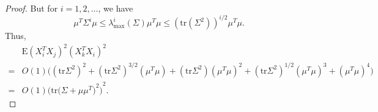 \documentclass[review]{elsarticle}
\theoremstyle{plain}
\theoremstyle{definition}
\theoremstyle{remark}
\begin{document}
\begin{proof}
    But for $i=1,2,\ldots$, we have
    $$
    \mu^T \Sigma^i \mu
    \leq \lambda_{\max}^i(\Sigma)\mu^T\mu
    \leq {(\mathrm{tr}(\Sigma^2))}^{i/2}\mu^T\mu.
    $$
    Thus,
        $$
        \begin{aligned}
            &\mathrm{E}{(X_i^T X_j)}^2{(X_k^T X_i)}^2\\
            =&
            O(1)\big({(\mathrm{tr}\Sigma^2)}^2+
            {(\mathrm{tr}\Sigma^2)}^{3/2}{(\mu^T \mu)}+
            {(\mathrm{tr}\Sigma^2)}{(\mu^T \mu)}^2+
            {(\mathrm{tr}\Sigma^2)}^{1/2}{(\mu^T \mu)}^3+
            {(\mu^T \mu)}^4
            \big)\\
            =& O(1){\Big(\mathrm{tr}{\big(\Sigma+\mu\mu^T\big)}^2\Big)}^2.
        \end{aligned}
        $$
\end{proof}
\end{document}

